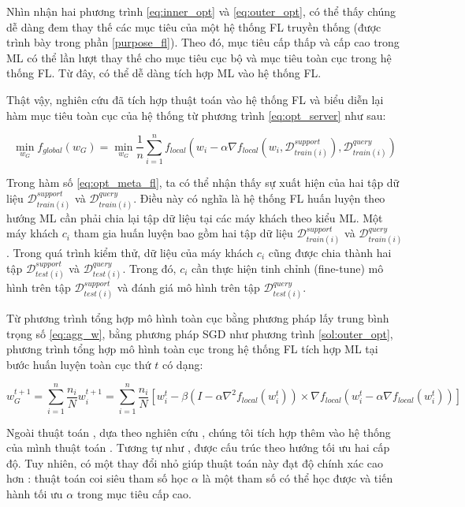 Nhìn nhận hai phương trình \ref{eq:inner_opt} và \ref{eq:outer_opt}, có thể thấy chúng dễ dàng đem thay thế các mục tiêu của một hệ thống FL truyền thống (được trình bày trong phần \ref{purpose_fl}). Theo đó, mục tiêu cấp thấp và cấp cao trong ML có thể lần lượt thay thế cho mục tiêu cục bộ và mục tiêu toàn cục trong hệ thống FL. Từ đây, có thể dễ dàng tích hợp ML vào hệ thống FL.

Thật vậy, nghiên cứu \cite{fallah2020personalized} đã tích hợp thuật toán  vào hệ thống FL và biểu diễn lại hàm mục tiêu toàn cục của hệ thống từ phương trình \ref{eq:opt_server} như sau:

\begin{equation}
    \label{eq:opt_meta_fl}
    \min_{w_G} f_{global}(w_G)
        =\min_{w_G} \frac{1}{n} \sum_{i=1}^n f_{local}\left(w_i - \alpha \nabla f_{local}(w_i, \mathcal{D}_{train(i)}^{support}), \mathcal{D}_{train(i)}^{query}\right)
\end{equation}

Trong hàm số \ref{eq:opt_meta_fl}, ta có thể nhận thấy sự xuất hiện của hai tập dữ liệu $\mathcal{D}_{train(i)}^{support}$ và $\mathcal{D}_{train(i)}^{query}$. Điều này có nghĩa là hệ thống FL huấn luyện theo hướng ML cần phải chia lại tập dữ liệu tại các máy khách theo kiểu ML. Một máy khách $c_i$ tham gia huấn luyện bao gồm hai tập dữ liệu $\mathcal{D}_{train(i)}^{support}$ và $\mathcal{D}_{train(i)}^{query}$. Trong quá trình kiểm thử, dữ liệu của máy khách $c_i$ cũng được chia thành hai tập $\mathcal{D}_{test(i)}^{support}$ và $\mathcal{D}_{test(i)}^{query}$. Trong đó, $c_i$ cần thực hiện tinh chỉnh (fine-tune) mô hình trên tập $\mathcal{D}_{test(i)}^{support}$ và đánh giá mô hình trên tập $\mathcal{D}_{test(i)}^{query}$.

Từ phương trình tổng hợp mô hình toàn cục bằng phương pháp lấy trung bình trọng số \ref{eq:agg_w}, bằng phương pháp SGD như phương trình \ref{sol:outer_opt}, phương trình tổng hợp mô hình toàn cục trong hệ thống FL tích hợp ML tại bước huấn luyện toàn cục thứ $t$ có dạng:

\begin{dmath}
    \label{eq:agg_fedmeta}
    w_G^{t+1} = \sum_{i=1}^n{\frac{n_i}{N} w_i^{t+1}}
        = \sum_{i=1}^n{\frac{n_i}{N}\left[ w_i^t - \beta \left( I - \alpha \nabla^2 f_{local}(w_i^t) \right) \times \nabla f_{local}\left( w_i^t - \alpha\nabla f_{local}(w_i^t)\right) \right]}
\end{dmath}

Ngoài thuật toán , dựa theo nghiên cứu \cite{chen2018federated}, chúng tôi tích hợp thêm vào hệ thống của mình thuật toán  \cite{li2017meta}. Tương tự như ,  được cấu trúc theo hướng tối ưu hai cấp độ. Tuy nhiên, có một thay đổi nhỏ giúp thuật toán này đạt độ chính xác cao hơn : thuật toán coi siêu tham số học $\alpha$ là một tham số có thể học được và tiến hành tối ưu $\alpha$ trong mục tiêu cấp cao.

